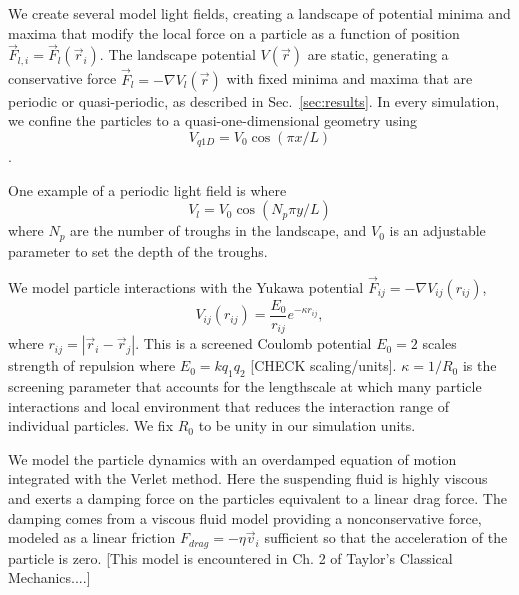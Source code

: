 \documentclass[prb,preprint]{revtex4}
\begin{document}
 We create several model light fields,
 creating a landscape of potential minima and maxima
 that modify the local force on a particle as a function of position
 $\vec{F}_{l,i} = \vec{F}_{l}(\vec{r}_i).$
 The landscape potential $V(\vec{r}) $ are static,
 generating a conservative force $\vec{F}_l= -\nabla V_l(\vec{r})$
 with fixed minima and maxima
 that are periodic or quasi-periodic,
 as described in Sec.~\ref{sec:results}.
 In every simulation, we confine
 the particles to a quasi-one-dimensional geometry
 using 
 \begin{equation}
   V_{q1D} = V_0 \cos{(\pi x / L)}
 \end{equation}.
 
 One example of a periodic light field is
 where 
 \begin{equation}
   V_l = V_0 \cos{(N_p \pi y / L)}
 \end{equation}
 where $N_p$ are the number of troughs in the landscape,
 and $V_0$ is an adjustable parameter
 to set the depth of the troughs.
 
 We model particle interactions with
 the Yukawa potential $\vec{F}_{ij} = -\nabla V_{ij}(r_{ij})$,
 \begin{equation}
   V_{ij}(r_{ij}) = \frac{E_0}{r_{ij}} e^{-\kappa r_{ij}},
 \end{equation}
 where $r_{ij} = |\vec{r}_i - \vec{r}_j|$.
 This is a
 screened Coulomb potential
 $E_0=2$ scales strength of repulsion
 where $E_0 = k q_1 q_2$  [CHECK scaling/units].
 $\kappa = 1/R_0$ is the screening parameter 
that accounts for the lengthscale at
which many particle
interactions and local environment
that reduces the interaction range of individual particles.
We fix $R_0$ to be unity in our simulation units.

We model the 
particle dynamics 
with an overdamped
equation of motion
integrated with the Verlet method.
Here 
the suspending fluid is highly viscous
and exerts a damping force on the particles equivalent
to a linear drag force.
The damping comes from a viscous fluid model
providing a nonconservative force,
modeled as a linear friction $F_{drag} = -\eta \vec{v}_i$
sufficient so that
the acceleration of the particle is zero.
[This model is encountered in Ch. 2 of Taylor's Classical Mechanics....]
\end{document}
